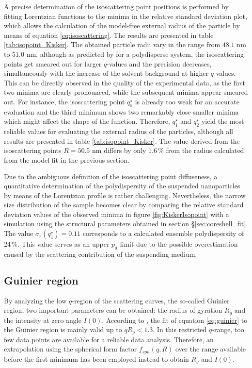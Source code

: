 A precise determination of the isoscattering point positions is performed by fitting Lorentzian functions to the minima in the relative standard deviation plot, which allows the calculation of the model-free external radius of the particle by means of equation \eqref{eq:isoscattering}. The results are presented in table \ref{tab:isopoint_Kisker}. The obtained particle radii vary in the range from \(48.1\) nm to \(51.0\) nm, although as predicted by \cite{kawaguchi_isoscattering_1992} for a polydisperse system, the isoscattering points get smeared out for larger \( q \)-values and the precision decreases, simultaneously with the increase of the solvent background at higher \(q\)-values. This can be directly observed in the quality of the experimental data, as the first two minima are clearly pronounced, while the subsequent minima appear smeared out. For instance, the isoscattering point \(q^{\star}_5\) is already too weak for an accurate evaluation and the third minimum shows two remarkably close smaller minima which might affect the shape of the function. Therefore, \(q^{\star}_1\) and \(q^{\star}_2\) yield the most reliable values for evaluating the external radius of the particles, although all results are presented in table \ref{tab:isopoint_Kisker}. The value derived from the isoscattering points \(R=50.5\) nm differs by only \(1.6\,\%\) from the radius calculated from the model fit in the previous section.

Due to the ambiguous definition of the isoscattering point diffuseness, a quantitative determination of the polydispersity of the suspended nanoparticles by means of the Lorentzian profile is rather challenging. Nevertheless, the narrow size distribution of the sample becomes clear by comparing the relative standard deviation values of the observed minima in figure \ref{fig:KiskerIsopoint} with a simulation using the structural parameters obtained in section \S\ref{sec:coreshell_fit}. The value \( \sigma_r(q^{\star}_1)=0.11 \) corresponds to a calculated ensemble polydispersity of \(24\,\% \). This value serves as an upper \( p_d \) limit due to the possible overestimation caused by the scattering contribution of the suspending medium.


\subsection{Guinier region}
\label{sec:guinier_analysis}
By analyzing the low \(q \)-region of the scattering curves, the so-called Guinier region, two important parameters can be obtained: the radius of gyration \(R_g\) and the intensity at zero angle \(I(0)\). According to \cite{feigin_structure_1987}, the fit of equation \eqref{eq:guinier} to the Guinier region is mainly valid up to \( qR_g<1.3 \). In this restricted \(q\)-range, too few data points are available for a reliable data analysis. Therefore, an extrapolation using the spherical form factor \( f_{sph}(q,R) \) over the range available before the first minimum has been employed instead to obtain \(R_g\) and \(I(0)\).

